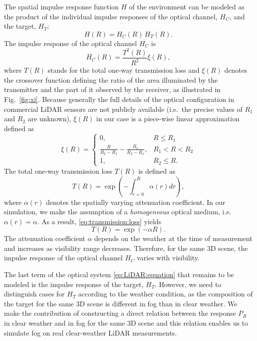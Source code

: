 \documentclass[10pt,twocolumn,letterpaper]{article}
\begin{document}
The spatial impulse response function $H$ of the environment can be modeled as the product of the individual impulse responses of the optical channel, $H_C$, and the target, $H_T$:
\begin{equation} \label{eq:impulse:response:decomposition}
    H(R) = H_C(R)\,H_T(R).
\end{equation}
The impulse response of the optical channel $H_C$ is
\begin{equation} \label{eq:impulse:response:channel}
    H_C(R) = \frac{T^2(R)}{R^2} \xi(R),
\end{equation}
where $T(R)$ stands for the total one-way transmission loss and $\xi(R)$ denotes the crossover function defining the ratio of the area illuminated by the transmitter and the part of it observed by the receiver, as illustrated in Fig.~\ref{fig:xi}. Because generally the full details of the optical configuration in commercial LiDAR sensors are not publicly available (i.e.\ the precise values of $R_1$ and $R_2$ are unknown), $\xi(R)$ in our case is a piece-wise linear approximation defined as
\begin{equation} \label{eq:xi}
    \xi(R) = \left\{
    \begin{array}{rl}
        0, & R \leq R_1 \\
        \frac{R}{R_2-R_1} -\frac{R_1}{R_2-R_1}, & R_1 < R < R_2 \\
        1, & R_2 \leq R.
    \end{array}
    \right.
\end{equation}
The total one-way transmission loss $T(R)$ is defined as 
\begin{equation} \label{eq:transmission:loss}
    T(R) = \exp \left(-\int_{r=0}^{R} \alpha(r)dr \right),
\end{equation}
where $\alpha(r)$ denotes the spatially varying attenuation coefficient. In our simulation, we make the assumption of a \emph{homogeneous} optical medium, i.e.\ $\alpha(r) = \alpha$. As a result, \eqref{eq:transmission:loss} yields 
\begin{equation} \label{eq:transmission:loss:homogeneous}
    T(R) = \exp\left(-\alpha{}R\right).
\end{equation}
The attenuation coefficient $\alpha$ depends on the weather at the time of measurement and increases as visibility range decreases. Therefore, for the same 3D scene, the impulse response of the optical channel $H_C$ varies with visibility.

The last term of the optical system \eqref{eq:LiDAR:equation} that remains to be modeled is the impulse response of the target, $H_T$. However, we need to distinguish cases for $H_T$ according to the weather condition, as the composition of the target for the same 3D scene is different in fog than in clear weather. We make the contribution of constructing a direct relation between the response $P_R$ in clear weather and in fog for the same 3D scene and this relation enables us to simulate fog on real clear-weather LiDAR measurements.
\end{document}
